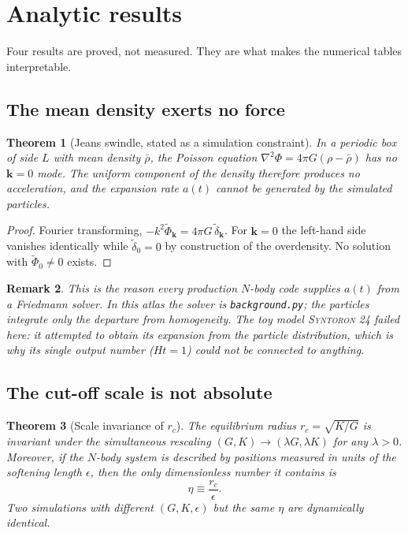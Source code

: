 \documentclass[11pt,a4paper]{article}
\newtheorem{theorem}{Theorem}[section]
\newtheorem{remark}[theorem]{Remark}
\theoremstyle{definition}
\begin{document}
\section{Analytic results}
\label{sec:analytic}

Four results are proved, not measured. They are what makes the numerical
tables interpretable.

\subsection{The mean density exerts no force}

\begin{theorem}[Jeans swindle, stated as a simulation constraint]
\label{thm:jeans}
In a periodic box of side $L$ with mean density $\bar\rho$, the Poisson
equation $\nabla^2\Phi = 4\pi G(\rho - \bar\rho)$ has no $\mathbf{k} = 0$
mode. The uniform component of the density therefore produces no
acceleration, and the expansion rate $a(t)$ cannot be generated by the
simulated particles.
\end{theorem}

\begin{proof}
Fourier transforming, $-k^2\tilde\Phi_{\mathbf k} = 4\pi G\,\tilde\delta_{\mathbf k}$.
For $\mathbf k = 0$ the left-hand side vanishes identically while
$\tilde\delta_0 = 0$ by construction of the overdensity. No solution with
$\tilde\Phi_0 \neq 0$ exists.
\end{proof}

\begin{remark}
This is the reason every production $N$-body code supplies $a(t)$ from a
Friedmann solver. In this atlas the solver is \texttt{background.py}; the
particles integrate only the departure from homogeneity. The toy model
\textsc{Syntoron 24} failed here: it attempted to obtain its expansion from
the particle distribution, which is why its single output number
($Ht = 1$) could not be connected to anything.
\end{remark}

\subsection{The cut-off scale is not absolute}

\begin{theorem}[Scale invariance of $r_c$]
\label{thm:scale}
The equilibrium radius $r_c = \sqrt{K/G}$ is invariant under the simultaneous
rescaling $(G, K) \to (\lambda G, \lambda K)$ for any $\lambda > 0$. Moreover,
if the $N$-body system is described by positions measured in units of the
softening length $\epsilon$, then the only dimensionless number it contains is
\begin{equation}
\eta \equiv \frac{r_c}{\epsilon}.
\end{equation}
Two simulations with different $(G, K, \epsilon)$ but the same $\eta$ are
dynamically identical.
\end{theorem}
\end{document}
